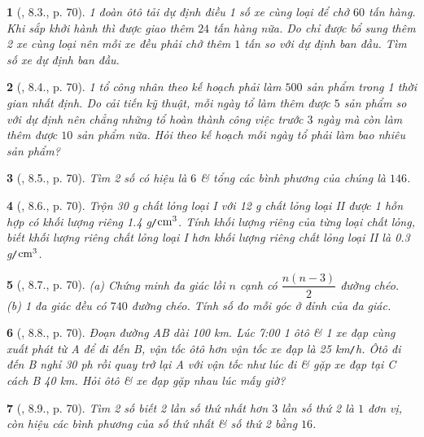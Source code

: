 \documentclass{article}
\newtheorem{baitoan}{}
\begin{document}
\begin{baitoan}[\cite{Binh_boi_duong_Toan_9_tap_2}, 8.3., p. 70]
	1 đoàn ôtô tải dự định điều 1 số xe cùng loại để chở $60$ tấn hàng. Khi sắp khởi hành thì được giao thêm $24$ tấn hàng nữa. Do chỉ được bổ sung thêm 2 xe cùng loại nên mỗi xe đều phải chở thêm $1$ tấn so với dự định ban đầu. Tìm số xe dự định ban đầu.
\end{baitoan}

\begin{baitoan}[\cite{Binh_boi_duong_Toan_9_tap_2}, 8.4., p. 70]
	1 tổ công nhân theo kế hoạch phải làm $500$ sản phẩm trong 1 thời gian nhất định. Do cải tiến kỹ thuật, mỗi ngày tổ làm thêm được $5$ sản phẩm so với dự định nên chẳng những tổ hoàn thành công việc trước $3$ ngày mà còn làm thêm được $10$ sản phẩm nữa. Hỏi theo kế hoạch mỗi ngày tổ phải làm bao nhiêu sản phẩm?
\end{baitoan}

\begin{baitoan}[\cite{Binh_boi_duong_Toan_9_tap_2}, 8.5., p. 70]
	Tìm 2 số có hiệu là $6$ \& tổng các bình phương của chúng là $146$.
\end{baitoan}

\begin{baitoan}[\cite{Binh_boi_duong_Toan_9_tap_2}, 8.6., p. 70]
	Trộn {\rm30 g} chất lỏng loại I với {\rm12 g} chất lỏng loại II được 1 hỗn hợp có khối lượng riêng {\rm1.4 g{\tt/}$\rm cm^3$}. Tính khối lượng riêng của từng loại chất lỏng, biết khối lượng riêng chất lỏng loại I hơn khối lượng riêng chất lỏng loại II là {\rm0.3 g{\tt/}$\rm cm^3$}.
\end{baitoan}

\begin{baitoan}[\cite{Binh_boi_duong_Toan_9_tap_2}, 8.7., p. 70]
	(a) Chứng minh đa giác lồi $n$ cạnh có $\dfrac{n(n - 3)}{2}$ đường chéo. (b) 1 đa giác đều có $740$ đường chéo. Tính số đo mỗi góc ở đỉnh của đa giác.
\end{baitoan}

\begin{baitoan}[\cite{Binh_boi_duong_Toan_9_tap_2}, 8.8., p. 70]
	Đoạn đường AB dài {\rm100 km}. Lúc {\rm7:00} 1 ôtô \& 1 xe đạp cùng xuất phát từ A để đi đến B, vận tốc ôtô hơn vận tốc xe đạp là {\rm25 km{\tt/}h}. Ôtô đi đến B nghỉ {\rm30 ph} rồi quay trở lại A với vận tốc như lúc đi \& gặp xe đạp tại C cách B {\rm40 km}. Hỏi ôtô \& xe đạp gặp nhau lúc mấy giờ?
\end{baitoan}

\begin{baitoan}[\cite{Binh_boi_duong_Toan_9_tap_2}, 8.9., p. 70]
	Tìm 2 số biết 2 lần số thứ nhất hơn $3$ lần số thứ 2 là $1$ đơn vị, còn hiệu các bình phương của số thứ nhất \& số thứ 2 bằng $16$.
\end{baitoan}
\end{document}
